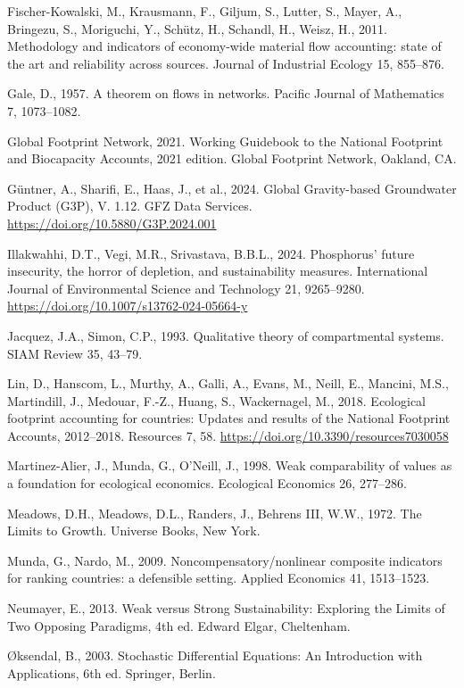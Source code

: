 \documentclass[11pt]{article}
\begin{document}
Fischer-Kowalski, M., Krausmann, F., Giljum, S., Lutter, S., Mayer, A., Bringezu, S., Moriguchi, Y., Sch\"{u}tz, H., Schandl, H., Weisz, H., 2011. Methodology and indicators of economy-wide material flow accounting: state of the art and reliability across sources. Journal of Industrial Ecology 15, 855--876.

Gale, D., 1957. A theorem on flows in networks. Pacific Journal of Mathematics 7, 1073--1082.

Global Footprint Network, 2021. Working Guidebook to the National Footprint and Biocapacity Accounts, 2021 edition. Global Footprint Network, Oakland, CA.

G\"{u}ntner, A., Sharifi, E., Haas, J., et al., 2024. Global Gravity-based Groundwater Product (G3P), V. 1.12. GFZ Data Services. \url{https://doi.org/10.5880/G3P.2024.001}

Illakwahhi, D.T., Vegi, M.R., Srivastava, B.B.L., 2024. Phosphorus' future insecurity, the horror of depletion, and sustainability measures. International Journal of Environmental Science and Technology 21, 9265--9280. \url{https://doi.org/10.1007/s13762-024-05664-y}

Jacquez, J.A., Simon, C.P., 1993. Qualitative theory of compartmental systems. SIAM Review 35, 43--79.

Lin, D., Hanscom, L., Murthy, A., Galli, A., Evans, M., Neill, E., Mancini, M.S., Martindill, J., Medouar, F.-Z., Huang, S., Wackernagel, M., 2018. Ecological footprint accounting for countries: Updates and results of the National Footprint Accounts, 2012--2018. Resources 7, 58. \url{https://doi.org/10.3390/resources7030058}

Martinez-Alier, J., Munda, G., O'Neill, J., 1998. Weak comparability of values as a foundation for ecological economics. Ecological Economics 26, 277--286.

Meadows, D.H., Meadows, D.L., Randers, J., Behrens III, W.W., 1972. The Limits to Growth. Universe Books, New York.

Munda, G., Nardo, M., 2009. Noncompensatory/\allowbreak{}nonlinear composite indicators for ranking countries: a defensible setting. Applied Economics 41, 1513--1523.

Neumayer, E., 2013. Weak versus Strong Sustainability: Exploring the Limits of Two Opposing Paradigms, 4th ed. Edward Elgar, Cheltenham.

\O{}ksendal, B., 2003. Stochastic Differential Equations: An Introduction with Applications, 6th ed. Springer, Berlin.
\end{document}
